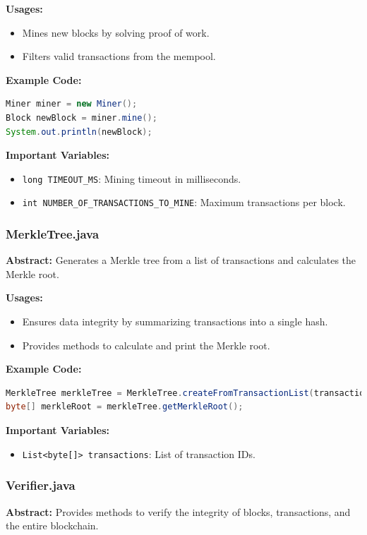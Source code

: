 \documentclass[12pt]{article}
\begin{document}
\textbf{Usages:}
\begin{itemize}
    \item Mines new blocks by solving proof of work.
    \item Filters valid transactions from the mempool.
\end{itemize}

\textbf{Example Code:}
\begin{lstlisting}[language=Java]
Miner miner = new Miner();
Block newBlock = miner.mine();
System.out.println(newBlock);
\end{lstlisting}

\textbf{Important Variables:}
\begin{itemize}
    \item \texttt{long TIMEOUT\_MS}: Mining timeout in milliseconds.
    \item \texttt{int NUMBER\_OF\_TRANSACTIONS\_TO\_MINE}: Maximum transactions per block.
\end{itemize}

\subsubsection{MerkleTree.java}
\textbf{Abstract:} Generates a Merkle tree from a list of transactions and calculates the Merkle root.

\textbf{Usages:}
\begin{itemize}
    \item Ensures data integrity by summarizing transactions into a single hash.
    \item Provides methods to calculate and print the Merkle root.
\end{itemize}

\textbf{Example Code:}
\begin{lstlisting}[language=Java]
MerkleTree merkleTree = MerkleTree.createFromTransactionList(transactions);
byte[] merkleRoot = merkleTree.getMerkleRoot();
\end{lstlisting}

\textbf{Important Variables:}
\begin{itemize}
    \item \texttt{List<byte[]> transactions}: List of transaction IDs.
\end{itemize}

\subsubsection{Verifier.java}
\textbf{Abstract:} Provides methods to verify the integrity of blocks, transactions, and the entire blockchain.
\end{document}
